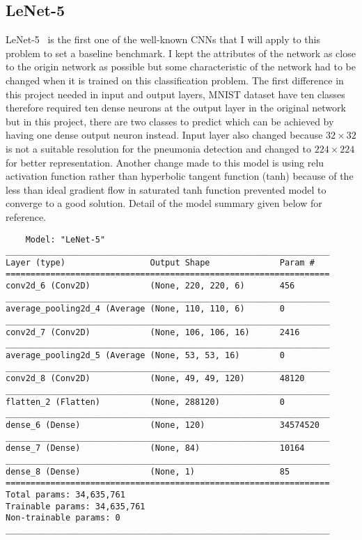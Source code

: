 \subsection{LeNet-5}
LeNet-5~\cite{Lenet5} is the first one of the well-known CNNs that I will apply to this problem to set a baseline benchmark.
I kept the attributes of the network as close to the origin network as possible but some characteristic of the network had to be changed when it is trained on this classification problem.
The first difference in this project needed in input and output layers, MNIST dataset have ten classes therefore required ten dense neurons at the output layer in the original network but in this project, there are two classes to predict which can be achieved by having one dense output neuron instead.
Input layer also changed because $32 \times 32$ is not a suitable resolution for the pneumonia detection and changed to $224 \times 224$ for better representation.
Another change made to this model is using relu activation function rather than hyperbolic tangent function (tanh) because of the less than ideal gradient flow in saturated tanh function prevented model to converge to a good solution.
Detail of the model summary given below for reference.

\begin{verbatim}
    Model: "LeNet-5"
_________________________________________________________________
Layer (type)                 Output Shape              Param #   
=================================================================
conv2d_6 (Conv2D)            (None, 220, 220, 6)       456       
_________________________________________________________________
average_pooling2d_4 (Average (None, 110, 110, 6)       0         
_________________________________________________________________
conv2d_7 (Conv2D)            (None, 106, 106, 16)      2416      
_________________________________________________________________
average_pooling2d_5 (Average (None, 53, 53, 16)        0         
_________________________________________________________________
conv2d_8 (Conv2D)            (None, 49, 49, 120)       48120     
_________________________________________________________________
flatten_2 (Flatten)          (None, 288120)            0         
_________________________________________________________________
dense_6 (Dense)              (None, 120)               34574520  
_________________________________________________________________
dense_7 (Dense)              (None, 84)                10164     
_________________________________________________________________
dense_8 (Dense)              (None, 1)                 85        
=================================================================
Total params: 34,635,761
Trainable params: 34,635,761
Non-trainable params: 0
_________________________________________________________________
\end{verbatim}

